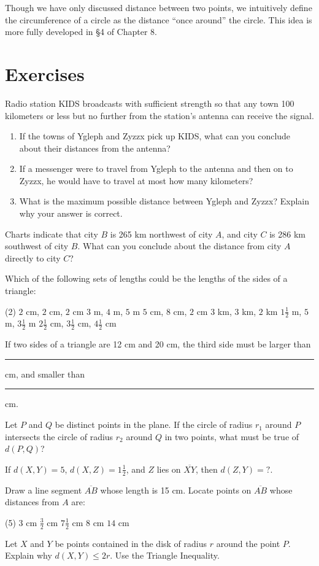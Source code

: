 \documentclass[12pt]{book} %
\begin{document}
Though we have only discussed distance between two points, we intuitively define the circumference of a circle as the distance ``once around'' the circle. This idea is more fully developed in \S4 of Chapter 8.

\section*{Exercises}

\begin{ExerciseList}
	\Exercise Radio station KIDS broadcasts with sufficient strength so that any town 100 kilometers or less but no further from the station's antenna can receive the signal.
	\begin{enumerate}
		\item If the towns of Ygleph and Zyzzx pick up KIDS, what can you conclude about their distances from the antenna?
		\item If a messenger were to travel from Ygleph to the antenna and then on to Zyzzx, he would have to travel at most how many kilometers?
		\item What is the maximum possible distance between Ygleph and Zyzzx? Explain why your answer is correct.
	\end{enumerate}
	
	\Exercise Charts indicate that city $B$ is 265 km northwest of city $A$, and city $C$ is 286 km southwest of city $B$. What can you conclude about the distance from city $A$ directly to city $C$?
	
	\Exercise Which of the following sets of lengths could be the lengths of the sides of a triangle:
	\begin{tasks}(2)
		\task[(a)] $2$ cm, $2$ cm, $2$ cm
		\task[(b)] $3$ m, $4$ m, $5$ m
		\task[(c)] $5$ cm, $8$ cm, $2$ cm
		\task[(d)] $3$ km, $3$ km, $2$ km
		\task[(e)] $1\frac{1}{2}$ m, $5$ m, $3\frac{1}{2}$ m
		\task[(f)] $2\frac{1}{2}$ cm, $3\frac{1}{2}$ cm, $4\frac{1}{2}$ cm
	\end{tasks}
	
	\Exercise If two sides of a triangle are 12 cm and 20 cm, the third side must be larger than \rule{2cm}{0.4pt} cm, and smaller than \rule{2cm}{0.4pt} cm.
	
	\Exercise Let $P$ and $Q$ be distinct points in the plane. If the circle of radius $r_1$ around $P$ intersects the circle of radius $r_2$ around $Q$ in two points, what must be true of $d(P,Q)$?
	
	\Exercise If $d(X,Y)=5$, $d(X,Z)=1\frac{1}{2}$, and $Z$ lies on $\overline{XY}$, then $d(Z,Y)=?$.
	
	\Exercise Draw a line segment $\overline{AB}$ whose length is 15 cm. Locate points on $\overline{AB}$ whose distances from $A$ are:
	\begin{tasks}(5)
		\task[(a)] $3$ cm
		\task[(b)] $\frac{3}{2}$ cm
		\task[(c)] $7\frac{1}{2}$ cm
		\task[(d)] $8$ cm
		\task[(e)] $14$ cm
	\end{tasks}
	
	\Exercise Let $X$ and $Y$ be points contained in the disk of radius $r$ around the point $P$. Explain why $d(X,Y)\le 2r$. Use the Triangle Inequality.
\end{ExerciseList}
\end{document}
